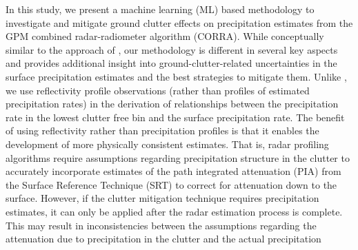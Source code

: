 \documentclass{ametsocV6.1} %
\begin{document}
In this study, we present a machine learning (ML) based methodology \citep{geron2022} to investigate and mitigate ground clutter effects on precipitation estimates from the GPM combined radar-radiometer algorithm (CORRA). While conceptually similar to the approach of \cite{hirose2021}, our methodology is different in several key aspects and provides additional insight into ground-clutter-related uncertainties in the surface precipitation estimates and the best strategies to mitigate them.  Unlike \cite{hirose2021}, we use reflectivity profile observations (rather than profiles of estimated precipitation rates) in the derivation of relationships between the precipitation rate in the lowest clutter free bin and the surface precipitation rate. The benefit of using reflectivity rather than precipitation profiles is that it enables the development of more physically consistent estimates. That is, radar profiling algorithms \citep{iguchi_atbd,grecu2016} require assumptions regarding precipitation structure in the clutter to accurately incorporate estimates of the path integrated attenuation (PIA) from the Surface Reference Technique (SRT) to correct for attenuation down to the surface. However, if the clutter mitigation technique requires precipitation estimates, it can only be applied after the radar estimation process is complete. This may result in inconsistencies between the assumptions regarding the attenuation due to precipitation in the clutter and the actual precipitation 
\end{document}
